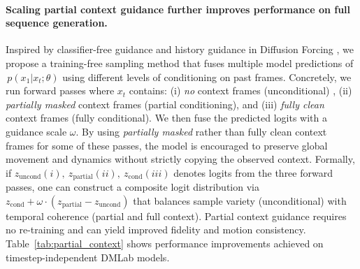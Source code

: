\paragraph{Scaling partial context guidance further improves performance on full sequence generation.}
Inspired by classifier-free guidance \cite{ho2021classifier} and history guidance in Diffusion Forcing \cite{chen2024diffusionforcing,song2025historyguidedvideodiffusion}, we propose a training-free sampling method that fuses multiple model predictions of \(\,p(x_{1}| x_{t};\theta)\) using different levels of conditioning on past frames. 
Concretely, we run forward passes where \(x_t\) contains: 
(i) \emph{no} context frames (unconditional) , 
(ii) \emph{partially masked} context frames (partial conditioning), 
and (iii) \emph{fully clean} context frames (fully conditional). 
We then fuse the predicted logits with a guidance scale $\omega$. 
By using \emph{partially masked} rather than fully clean context frames for some of these passes, the model is encouraged to preserve global movement and dynamics without strictly copying the observed context. Formally, if \(z_{\mathrm{uncond}} (i),\ z_{\mathrm{partial}}(ii),\ z_{\mathrm{cond}} (iii)\) denotes logits from the three forward passes, one can construct a composite logit distribution via
$z_{\mathrm{cond}} + \omega \cdot (z_{\mathrm{partial}} - z_{\mathrm{uncond}})$ that balances sample variety (unconditional) with temporal coherence (partial and full context). Partial context guidance requires no re-training and can yield improved fidelity and motion consistency. Table~\ref{tab:partial_context} shows performance improvements achieved on timestep-independent DMLab models.



